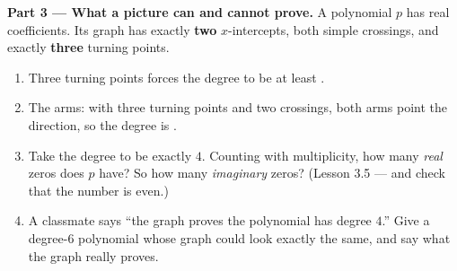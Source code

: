 \documentclass[10pt]{article}
\begin{document}
\begin{tcolorbox}[colback=white, colframe=black!40, title=\textbf{Tier E --- Extension},
    fonttitle=\bfseries, arc=1.5mm, left=3mm, right=3mm, top=2mm, bottom=2mm, breakable]
\vspace{5pt}
\textbf{Part 3 --- What a picture can and cannot prove.} A polynomial $p$ has real coefficients. Its
graph has exactly \textbf{two} $x$-intercepts, both simple crossings, and exactly \textbf{three}
turning points.
\begin{enumerate}[label=(\alph*), leftmargin=1.8em, itemsep=6pt]
  \item Three turning points forces the degree to be at least \blank{1.0cm}.
  \item The arms: with three turning points and two crossings, both arms point the \blank{2.4cm}
        direction, so the degree is \blank{1.6cm}.
  \item Take the degree to be exactly $4$. Counting with multiplicity, how many \emph{real} zeros
        does $p$ have? \blank{1.2cm} \; So how many \emph{imaginary} zeros? \blank{1.2cm} \;
        (Lesson 3.5 --- and check that the number is even.)
  \item A classmate says ``the graph proves the polynomial has degree $4$.'' Give a degree-$6$
        polynomial whose graph could look exactly the same, and say what the graph really proves.
\end{enumerate}
\end{tcolorbox}
\end{document}
